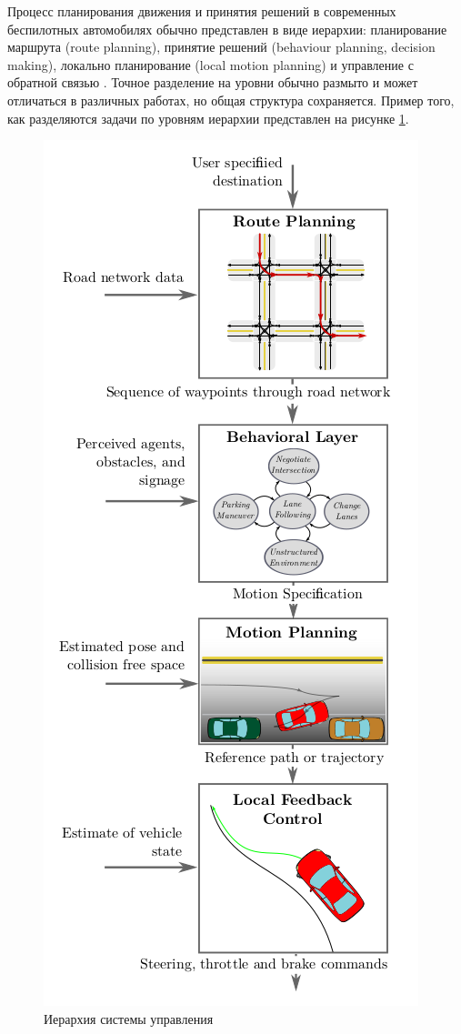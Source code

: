 Процесс планирования движения и принятия решений в современных беспилотных автомобилях обычно представлен в виде
иерархии: планирование маршрута (route planning), принятие решений (behaviour planning, decision making), локально
планирование (local motion planning) и управление с обратной связью \cite{motion_planning_survey}. Точное разделение на
уровни обычно размыто и может отличаться в различных работах, но общая структура сохраняется. Пример того, как
разделяются задачи по уровням иерархии представлен на рисунке  \ref{img:planning_hierarchy}.

\begin{figure}
    \centering
    \includegraphics[height=\textheight-3cm]{images/planning_hierarchy} %
    \caption{Иерархия системы управления}
    \label{img:planning_hierarchy}
\end{figure}

